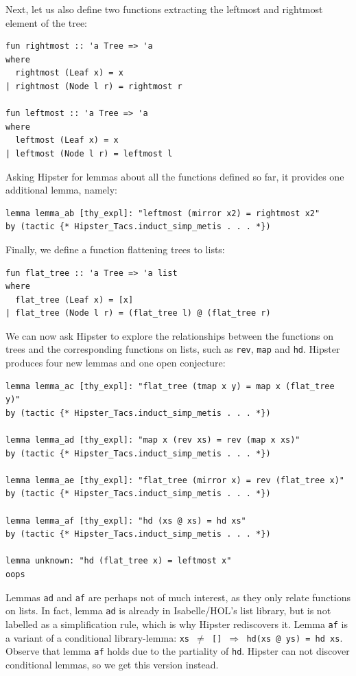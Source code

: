 Next, let us also define two functions extracting the leftmost and rightmost element of the tree:
\begin{small}
\begin{verbatim}
fun rightmost :: 'a Tree => 'a
where 
  rightmost (Leaf x) = x
| rightmost (Node l r) = rightmost r

fun leftmost :: 'a Tree => 'a
where 
  leftmost (Leaf x) = x
| leftmost (Node l r) = leftmost l
\end{verbatim}
\end{small}
Asking Hipster for lemmas about all the functions defined so far, it provides one additional lemma, namely:
\begin{small}
\begin{verbatim}
lemma lemma_ab [thy_expl]: "leftmost (mirror x2) = rightmost x2"
by (tactic {* Hipster_Tacs.induct_simp_metis . . . *})
\end{verbatim}
\end{small}
Finally, we define a function flattening trees to lists:
\begin{small}
\begin{verbatim}
fun flat_tree :: 'a Tree => 'a list
where
  flat_tree (Leaf x) = [x]
| flat_tree (Node l r) = (flat_tree l) @ (flat_tree r)
\end{verbatim}
\end{small}
We can now ask Hipster to explore the relationships between the functions on trees and the corresponding functions on lists, such as \texttt{rev}, \texttt{map} and \texttt{hd}. Hipster produces four new lemmas and one open conjecture:
\begin{small}
\begin{verbatim}
lemma lemma_ac [thy_expl]: "flat_tree (tmap x y) = map x (flat_tree y)"
by (tactic {* Hipster_Tacs.induct_simp_metis . . . *})

lemma lemma_ad [thy_expl]: "map x (rev xs) = rev (map x xs)"
by (tactic {* Hipster_Tacs.induct_simp_metis . . . *})

lemma lemma_ae [thy_expl]: "flat_tree (mirror x) = rev (flat_tree x)"
by (tactic {* Hipster_Tacs.induct_simp_metis . . . *})

lemma lemma_af [thy_expl]: "hd (xs @ xs) = hd xs"
by (tactic {* Hipster_Tacs.induct_simp_metis . . . *})

lemma unknown: "hd (flat_tree x) = leftmost x"
oops
\end{verbatim}
\end{small}
Lemmas \texttt{ad} and \texttt{af} are perhaps not of much interest, as they only relate functions on lists. In fact, lemma \texttt{ad} is already in Isabelle/HOL's list library, but is not labelled as a simplification rule, which is why Hipster rediscovers it. Lemma \texttt{af} is a variant of a conditional library-lemma: \hbox{\texttt{xs $\neq$ [] $\Longrightarrow$ hd(xs @ ys) = hd xs}}. Observe that lemma \texttt{af} holds due to the partiality of \texttt{hd}. Hipster can not discover conditional lemmas, so we get this version instead. 

